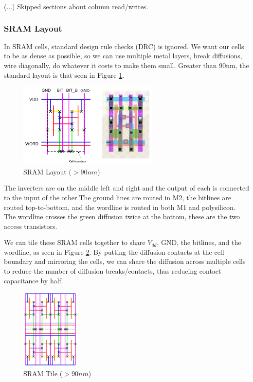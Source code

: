 \documentclass{article}
\begin{document}
(...) Skipped sections about column read/writes.

\subsubsection{SRAM Layout}

In SRAM cells, standard design rule checks (DRC) is ignored. We want our cells to be as dense as possible, so we can use multiple metal layers, break diffusions, wire diagonally, do whatever it costs to make them small. Greater than 90nm, the standard layout is that seen in Figure \ref{SRAMLayout}. 

\begin{figure}[ht!]
\centering
\includegraphics[width=70mm]{SRAMLayout.png}
\caption{SRAM Layout ($>90nm$)}
\label{SRAMLayout}
\end{figure}

The inverters are on the middle left and right and the output of each is connected to the input of the other.The ground lines are routed in M2, the bitlines are routed top-to-bottom, and the wordline is routed in both M1 and polysilicon. The wordline crosses the green diffusion twice at the bottom, these are the two access transistors.

We can tile these SRAM cells together to share $V_{dd}$, GND, the bitlines, and the wordline, as seen in Figure \ref{SRAMTile}. By putting the diffusion contacts at the cell-boundary and mirroring the cells, we can share the diffusion across multiple cells to reduce the number of diffusion breaks/contacts, thus reducing contact capacitance by half. 

\begin{figure}[ht!]
\centering
\includegraphics[width=30mm]{SRAMTile.png}
\caption{SRAM Tile ($>90nm$)}
\label{SRAMTile}
\end{figure}
\end{document}
